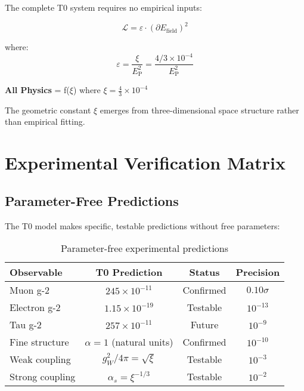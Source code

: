 \documentclass[12pt,a4paper]{report}
\newcommand{\EP}{E_{\text{P}}}            %
\begin{document}
The complete T0 system requires no empirical inputs:

\begin{equation}
	\boxed{\mathcal{L} = \varepsilon \cdot (\partial E_{\text{field}})^2}
\end{equation}

where:
\begin{equation}
	\varepsilon = \frac{\xi}{\EP^2} = \frac{4/3 \times 10^{-4}}{\EP^2}
\end{equation}

\begin{tcolorbox}[colback=green!5!white,colframe=green!75!black,title=Parameter-Free Physics]
	\textbf{All Physics} = f($\xi$) where $\xi = \frac{4}{3} \times 10^{-4}$
	
	The geometric constant $\xi$ emerges from three-dimensional space structure rather than empirical fitting.
\end{tcolorbox}

\section{Experimental Verification Matrix}
\label{sec:experimental_verification}

\subsection{Parameter-Free Predictions}
\label{subsec:parameter_free_predictions}

The T0 model makes specific, testable predictions without free parameters:

\begin{table}[htbp]
	\centering
	\begin{tabular}{lccc}
		\toprule
		\textbf{Observable} & \textbf{T0 Prediction} & \textbf{Status} & \textbf{Precision} \\
		\midrule
		Muon g-2 & $245 \times 10^{-11}$ & Confirmed & $0.10\sigma$ \\
		Electron g-2 & $1.15 \times 10^{-19}$ & Testable & $10^{-13}$ \\
		Tau g-2 & $257 \times 10^{-11}$ & Future & $10^{-9}$ \\
		Fine structure & $\alpha = 1$ (natural units) & Confirmed & $10^{-10}$ \\
		Weak coupling & $g_W^2/4\pi = \sqrt{\xi}$ & Testable & $10^{-3}$ \\
		Strong coupling & $\alpha_s = \xi^{-1/3}$ & Testable & $10^{-2}$ \\
		\bottomrule
	\end{tabular}
	\caption{Parameter-free experimental predictions}
	\label{tab:parameter_free_predictions}
\end{table}
\end{document}
